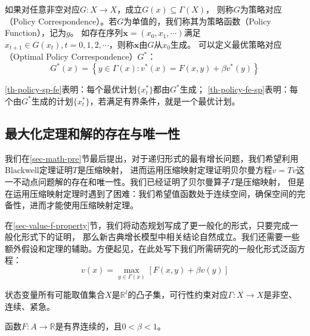 \begin{definition}
    如果对任意非空对应$G: X\rightarrow X$，成立$G\left(x\right)\subseteq \Gamma\left(X\right)$，
    则称$G$为策略对应（Policy Correspondence）。若$G$为单值的，我们称其为策略函数（Policy Function），记为$g$。
    如存在序列$\boldsymbol{x}=\left(x_0,x_1,\cdots\right)$满足
    $x_{t+1}\in G\left(x_t\right), t=0,1,2,\cdots$，则称$\boldsymbol{x}$由$G$从$x_0$生成。
    可以定义最优策略对应（Optimal Policy Correspondence）$G^*$：
    $$
    G^*(x)=\left\{y \in \Gamma(x): v^*(x)=F(x, y)+\beta v^*(y)\right\}
    $$
\end{definition}
\cref{th-policy-sp-fe}表明：每个最优计划$\{x_t^*\}$都由$G^*$生成；
\cref{th-policy-fe-sp}表明：每个由$G^*$生成的计划$\{x_t^*\}$，若满足有界条件，就是一个最优计划。


\subsection{最大化定理和解的存在与唯一性}

我们在\ref{sec-math-pre}节最后提出，对于递归形式的最有增长问题，我们希望利用Blackwell定理证明$T$是压缩映射，
进而运用压缩映射定理证明贝尔曼方程$v=Tv$这一不动点问题解的存在和唯一性。我们已经证明了贝尔曼算子$T$是压缩映射，
但是在运用压缩映射定理时遇到了困难：我们希望值函数处于连续空间，确保空间的完备性，进而才能使用压缩映射定理。

在\ref{sec-value-f-property}节，我们将动态规划写成了更一般化的形式，只要完成一般化形式下的证明，
那么新古典增长模型中相关结论自然成立。我们还需要一些额外假设和定理的辅助。方便起见，在此处写下我们所需研究的一般化形式泛函方程：
\begin{equation}    \label{eq-general-fe}
    v\left(x\right)=\max_{y\in\Gamma\left(x\right)}\left[F\left(x,y\right)+\beta v\left(y\right)\right]
\end{equation}

\begin{assumption}[凸性假设] \label{as-convex-X}
    状态变量所有可能取值集合$X$是$\mathbb{R}^l$的凸子集，可行性约束对应$\Gamma :X\rightarrow X$是非空、连续、紧急。
\end{assumption}

\begin{assumption}[有界回报]  \label{as-bounded-returns}
    函数$F: A\rightarrow \mathbb{R}$是有界连续的，且$0<\beta<1$。
\end{assumption}

